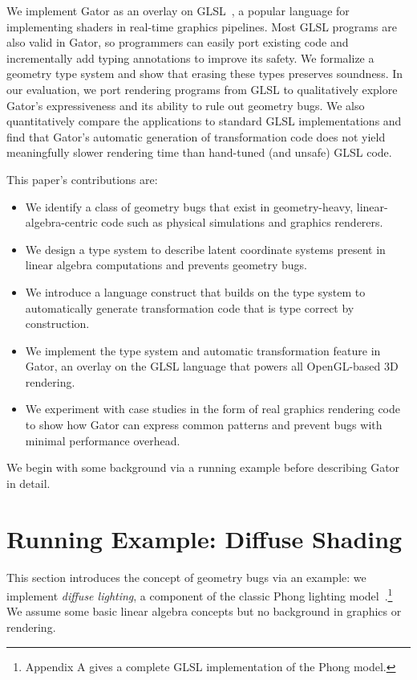 We implement Gator as an overlay on GLSL~\cite{glsl}, a popular language for implementing shaders in real-time graphics pipelines.
Most GLSL programs are also valid in Gator, so programmers can easily port existing code and incrementally add typing annotations to improve its safety.
We formalize a geometry type system and show that erasing these types preserves soundness.
In our evaluation, we port rendering programs from GLSL to qualitatively explore Gator's expressiveness and its ability to rule out geometry bugs.
We also quantitatively compare the applications to standard GLSL implementations and find that Gator's automatic generation of transformation code does not yield meaningfully slower rendering time than hand-tuned (and unsafe) GLSL code.

This paper's contributions are:
%
\begin{itemize}
\item We identify a class of geometry bugs that exist in geometry-heavy, linear-algebra-centric code such as physical simulations and graphics renderers.
\item We design a type system to describe latent coordinate systems present in linear algebra computations and prevents geometry bugs.
\item We introduce a language construct that builds on the type system to automatically generate transformation code that is type correct by construction.
\item We implement the type system and automatic transformation feature in Gator, an overlay on the GLSL language that powers all OpenGL-based 3D rendering.
\item We experiment with case studies in the form of real graphics rendering code to show how Gator can express common patterns and prevent bugs with minimal performance overhead.
\end{itemize}
%
We begin with some background via a running example
before describing Gator in detail.


\section{Running Example: Diffuse Shading}
\label{sec:example}

This section introduces the concept of geometry bugs via an example:
we implement \emph{diffuse lighting}, a component of the classic Phong lighting model~\cite{phong}.\footnote{Appendix A gives a complete GLSL implementation of the Phong model.}
We assume some basic linear algebra concepts but no background in graphics or rendering.

